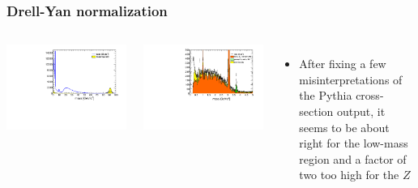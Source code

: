 \documentclass[compress]{beamer}
\begin{document}
\begin{frame}
\frametitle{Drell-Yan normalization}

\begin{columns}
\includegraphics[width=\linewidth]{normalizing_to_the_z_naive.pdf}

\includegraphics[width=\linewidth]{lowdimuon_mass_nobcuts_naive.pdf}

\begin{itemize}
\item After fixing a few misinterpretations of the Pythia
  cross-section output, it seems to be about right for the low-mass
  region and a factor of two too high for the $Z$
\end{itemize}
\end{columns}
\end{frame}
\end{document}

